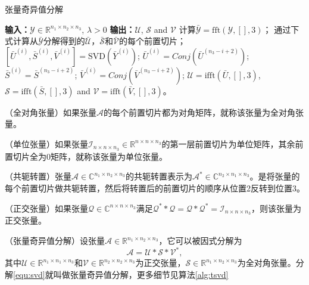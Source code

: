 \begin{algorithm}[!htbp]
	\caption{张量奇异值分解\cite{34}}\label{alg:tsvd}
	\begin{algorithmic}[1]
		\State \textbf{输入：}$\mathcal{Y}\in \mathbb{R}^{n_1 \times n_2 \times n_3}$, $\lambda>0$
		\State \textbf{输出：}$\mathcal{U}$, $\mathcal{S}$ and $ \mathcal{V}$
		\State 计算$\mathcal{\bar Y} =\mathrm{fft}(\mathcal{Y} ,[],3)$；
		\State 通过下式计算从$\mathcal{\bar Y} $分解得到的$\mathcal{\bar U} $，$\mathcal{\bar S} $和$\mathcal{\bar V} $的每个前置切片；
		\State$[\bar U^{(i)},\bar S^{(i)}, \bar V^{(i)}]=\text{SVD}(\bar Y^{(i)})$;
		\EndFor
		\State$\bar U^{(i)}=Conj(\bar U^{(n_3-i+2)})$;
		\State$\bar S^{(i)}= \bar S^{(n_3-i+2)}$;
		\State$\bar V^{(i)}=Conj(\bar V^{(n_3-i+2)})$;
		\EndFor
		\State$\mathcal{U}=\mathrm{ifft}(\bar U ,[],3)$, $\mathcal{S}=\mathrm{ifft}(\bar S,[],3)$ and $ \mathcal{V}=\mathrm{ifft}(\bar V,[],3)$。
	\end{algorithmic}
\end{algorithm}

\begin{definition}
	（全对角张量\cite{18}）如果张量$ \mathcal{A} $的每个前置切片都为对角矩阵，就称该张量为全对角张量。
\end{definition}

\begin{definition}
	（单位张量\cite{18}）如果张量$\mathcal{I}_{n \times n  \times n_3} \in \mathbb{R}^{n \times n  \times n_3}$的第一层前置切片为单位矩阵，其余前置切片全为0矩阵，就称该张量为单位张量。
\end{definition}

\begin{definition}
	（共轭转置\cite{18}）张量$\mathcal{A}\in \mathbb{C}^{n_1\times n_2 \times n_3}$的共轭转置表示为$\mathcal{A}^*\in \mathbb{C}^{ n_2 \times n_1  \times n_3} $。是将张量的每个前置切片做共轭转置，然后将转置后的前置切片的顺序从位置2反转到位置3。
\end{definition}

\begin{definition}
	（正交张量\cite{18}）如果张量$\mathcal{Q}\in \mathbb{C}^{n\times n \times n_3}$满足$\mathcal{Q}^* \ast  \mathcal{Q}=\mathcal{Q} \ast \mathcal{Q}^*=\mathcal{I}_{n\times n \times n_3}$，则该张量为正交张量。
\end{definition}

\begin{theorem}
	（张量奇异值分解\cite{18}）设张量$\mathcal{A}\in \mathbb{R}^{n_1\times n_2 \times n_3}$，它可以被因式分解为	
	\begin{equation}\label{equ:svd}
	\mathcal{A}=\mathcal{U} \ast \mathcal{S} \ast \mathcal{V}^*	,
	\end{equation}
	其中$\mathcal{U}  \in \mathbb{R}^{n_1\times n_1 \times n_3 }$和$\mathcal{V} \in \mathbb{R}^{n_2\times n_2 \times n_3 }$为正交张量，$\mathcal{S} \in\mathbb{R}^{n_1\times n_2 \times n_3}$为全对角张量。分解\ref{equ:svd}就叫做张量奇异值分解，更多细节见算法\ref{alg:tsvd}
\end{theorem}

